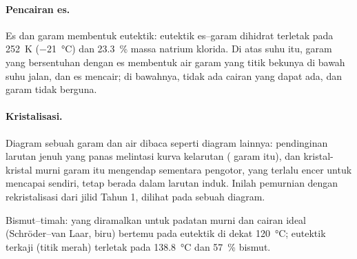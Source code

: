 \paragraph{Pencairan es.} Es dan garam membentuk eutektik: eutektik es--garam
dihidrat terletak pada \qty{252}{K} (\qty{-21}{\degreeCelsius}) dan
23.3~\% massa natrium klorida. Di atas suhu itu, garam yang bersentuhan
dengan es membentuk air garam yang titik bekunya di bawah suhu jalan, dan
es mencair; di bawahnya, tidak ada cairan yang dapat ada, dan garam tidak
berguna.

\paragraph{Kristalisasi.} Diagram sebuah garam dan air dibaca seperti
diagram lainnya: pendinginan larutan jenuh yang panas melintasi kurva
kelarutan ( garam itu), dan kristal-kristal murni garam itu
mengendap sementara pengotor, yang terlalu encer untuk mencapai
 sendiri, tetap berada dalam larutan induk. Inilah pemurnian
dengan rekristalisasi dari jilid Tahun 1, dilihat pada sebuah diagram.

\begin{omfigure}

{\small Bismut--timah:  yang diramalkan untuk padatan murni dan
cairan ideal (Schröder--van Laar, biru) bertemu pada eutektik di dekat
\qty{120}{\degreeCelsius}; eutektik terkaji (titik merah) terletak pada
\qty{138.8}{\degreeCelsius} dan 57~\% bismut.}
\end{omfigure}

